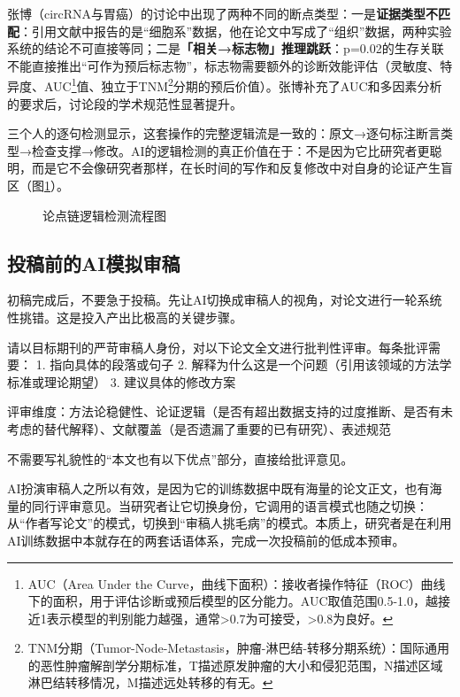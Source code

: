 张博（circRNA与胃癌）的讨论中出现了两种不同的断点类型：一是\textbf{证据类型不匹配}：引用文献中报告的是``细胞系''数据，他在论文中写成了``组织''数据，两种实验系统的结论不可直接等同；二是\textbf{「相关→标志物」推理跳跃}：p=0.02的生存关联不能直接推出``可作为预后标志物''，标志物需要额外的诊断效能评估（灵敏度、特异度、AUC\footnote{AUC（Area Under the Curve，曲线下面积）：接收者操作特征（ROC）曲线下的面积，用于评估诊断或预后模型的区分能力。AUC取值范围0.5-1.0，越接近1表示模型的判别能力越强，通常>0.7为可接受，>0.8为良好。}值、独立于TNM\footnote{TNM分期（Tumor-Node-Metastasis，肿瘤-淋巴结-转移分期系统）：国际通用的恶性肿瘤解剖学分期标准，T描述原发肿瘤的大小和侵犯范围，N描述区域淋巴结转移情况，M描述远处转移的有无。}分期的预后价值）。张博补充了AUC和多因素分析的要求后，讨论段的学术规范性显著提升。

三个人的逐句检测显示，这套操作的完整逻辑流是一致的：原文→逐句标注断言类型→检查支撑→修改。AI的逻辑检测的真正价值在于：不是因为它比研究者更聪明，而是它不会像研究者那样，在长时间的写作和反复修改中对自身的论证产生盲区（图\ref{fig:ch5_06}）。

\begin{figure}[H]
\centering
{}
\caption{论点链逻辑检测流程图}
\label{fig:ch5_06}
\end{figure}
\par


\subsection{投稿前的AI模拟审稿}

初稿完成后，不要急于投稿。先让AI切换成审稿人的视角，对论文进行一轮系统性挑错。这是投入产出比极高的关键步骤。

\begin{userbox}
请以目标期刊的严苛审稿人身份，对以下论文全文进行批判性评审。每条批评需要：
1. 指向具体的段落或句子
2. 解释为什么这是一个问题（引用该领域的方法学标准或理论期望）
3. 建议具体的修改方案

评审维度：方法论稳健性、论证逻辑（是否有超出数据支持的过度推断、是否有未考虑的替代解释）、文献覆盖（是否遗漏了重要的已有研究）、表述规范

不需要写礼貌性的``本文也有以下优点''部分，直接给批评意见。
\end{userbox}

AI扮演审稿人之所以有效，是因为它的训练数据中既有海量的论文正文，也有海量的同行评审意见。当研究者让它切换身份，它调用的语言模式也随之切换：从``作者写论文''的模式，切换到``审稿人挑毛病''的模式。本质上，研究者是在利用AI训练数据中本就存在的两套话语体系，完成一次投稿前的低成本预审。

